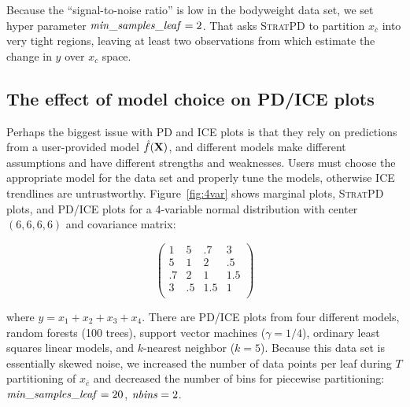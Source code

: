 \documentclass[12pt]{article}
\newcommand{\figref}[1]{Figure~\ref{#1}}
\newcommand{\spd}{\fontfamily{cmr}\textsc{\small StratPD}}
\newcommand{\xnc}{$x_{\overline{c}}$}
\begin{document}
Because the ``signal-to-noise ratio'' is low in the bodyweight data set, we set hyper parameter ${\it min\_samples\_leaf}=2$. That asks \spd{} to partition \xnc{} into very tight regions, leaving at least two observations from which estimate the change in $y$ over $x_c$ space.

\subsection{The effect of model choice on PD/ICE plots}

Perhaps the biggest issue with PD and ICE plots is that they rely on predictions from a user-provided model $\hat{f}(\bf X)$, and different models make different assumptions and have different strengths and weaknesses.  Users must choose the appropriate model for the data set and properly tune the models, otherwise ICE trendlines are untrustworthy. \figref{fig:4var} shows marginal plots, \spd{} plots, and PD/ICE plots for a 4-variable normal distribution with center $(6, 6, 6, 6)$ and covariance matrix:

\[
\left(
\begin{array}{cccc}
1 & 5 &.7 & 3\\
5 &1 &2 &.5\\
.7 &2 & 1 & 1.5\\
3 &.5 &1.5 &1\\
\end{array}
\right)
\]

\noindent where $y = x_1 + x_2 + x_3 + x_4$.  There are PD/ICE plots from four different models, random forests (100 trees), support vector machines ($\gamma=1/4$), ordinary least squares linear models, and $k$-nearest neighbor ($k=5$).  Because this data set is essentially skewed noise, we increased the number of data points per leaf during $T$ partitioning of \xnc{} and decreased the number of bins for piecewise partitioning: ${\it min\_samples\_leaf} = 20$, ${\it nbins} = 2$.
\end{document}
